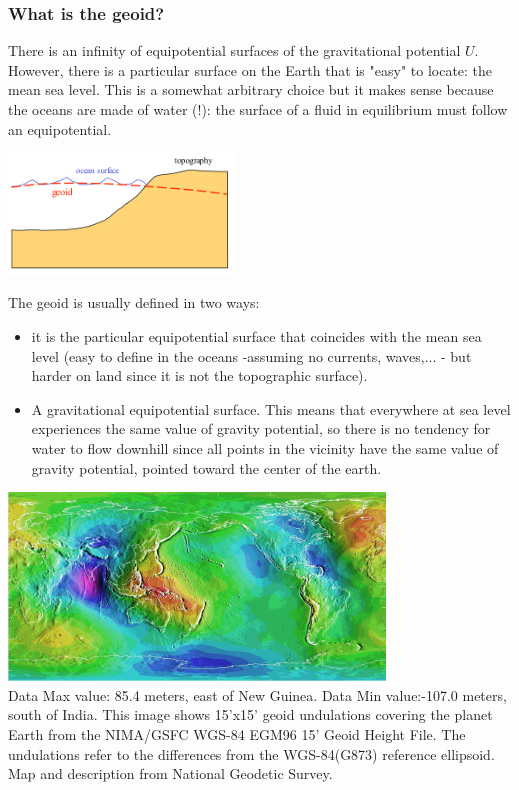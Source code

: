 
\subsubsection{What is the geoid?}


There is an infinity of equipotential surfaces of the gravitational potential $U$.
However, there is a particular surface on the Earth that is "easy" to locate: 
the mean sea level. This is a somewhat arbitrary choice  
but it makes sense because the oceans are made of water (!): 
the surface of a fluid in equilibrium must follow an equipotential.

\begin{center}
\includegraphics[width=6cm]{images/geoid/geoid1}
\end{center}

The geoid is usually defined in two ways:
\begin{itemize}
\item it is the particular equipotential surface that coincides with the mean sea level
 (easy to define in the oceans -assuming no currents, waves,... - but harder on land since 
it is not the topographic surface).
\item A gravitational equipotential surface. This means that everywhere at sea level experiences the same value of gravity potential, so there is no tendency for water to flow downhill since all points in the vicinity have the same value of gravity potential, pointed toward the center of the earth.
\end{itemize}

\begin{center}
\includegraphics[width=10cm]{images/geoid/ww15mgh}\\
{\captionfont Data Max value: 85.4 meters, east of New Guinea. Data Min value:-107.0 meters, south of India. 
This image shows 15'x15' geoid undulations covering the planet Earth from the NIMA/GSFC WGS-84 EGM96 15' Geoid Height File. The undulations refer to the differences from the WGS-84(G873) reference ellipsoid. Map and description from National Geodetic Survey.}
\end{center}


